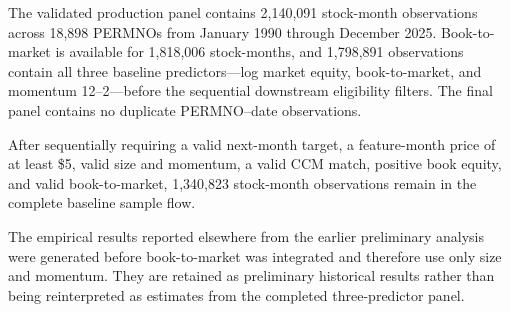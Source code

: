 The validated production panel contains 2,140,091 stock-month observations across 18,898 PERMNOs from January 1990 through December 2025. Book-to-market is available for 1,818,006 stock-months, and 1,798,891 observations contain all three baseline predictors---log market equity, book-to-market, and momentum 12--2---before the sequential downstream eligibility filters. The final panel contains no duplicate PERMNO--date observations.

After sequentially requiring a valid next-month target, a feature-month price of at least \$5, valid size and momentum, a valid CCM match, positive book equity, and valid book-to-market, 1,340,823 stock-month observations remain in the complete baseline sample flow.

The empirical results reported elsewhere from the earlier preliminary analysis were generated before book-to-market was integrated and therefore use only size and momentum. They are retained as preliminary historical results rather than being reinterpreted as estimates from the completed three-predictor panel.
